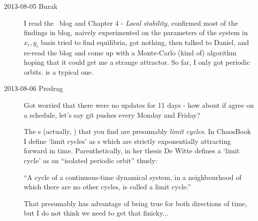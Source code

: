 \begin{description}
\item[2013-08-05  Burak] I read the \twoMode\ blog and
     {Chapter 4} -
    {\em Local stability}, confirmed most of the findings in blog,
    naively experimented on the parameters of the system in $x_i, y_i$
    basis tried to find equilibria, got nothing, then talked to Daniel,
    and re-read the blog and come up with a Monte-Carlo (kind of)
    algorithm hoping that it could get me a strange attractor. So far,
    I only got periodic orbits.  is a typical one.

\item[2013-08-06 Predrag]
Got worried that there were no updates for 11 days - how about if agree
on a schedule, let's say git pushes
\textcolor[rgb]{1.00,0.00,0.00}{every Monday and Friday}?

                                            \toCB
The \po s (actually, \reqva) that you find are presumably \emph{limit
cycles}. In ChaosBook I define `limit cycles' as \po s which are strictly
exponentially attracting forward in time. Parenthetically, in her thesis
De Witte defines a `limit cycle' as an ``isolated
periodic orbit'' thusly:

``A cycle of a continuous-time dynamical system, in a neighbourhood of
which there are no other cycles, is called a limit cycle.''

That presumably has advantage of being true for both directions of time,
but I do not think we need to get that finicky...



\end{description}
